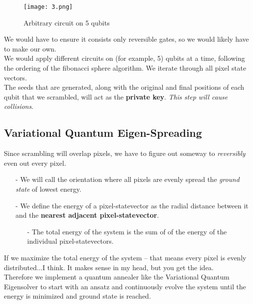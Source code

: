 \documentclass[svgnames]{article}     %
\begin{document}
\begin{figure}[H]
  \centering
    \texttt{[image: 3.png]}
    \caption{Arbitrary circuit on 5 qubits} 
\end{figure}

We would have to ensure it consists only reversible gates, so we would likely
have to make our own. \\

We would apply different circuits on (for example, 5) qubits at a time,
following the ordering of the fibonacci sphere algorithm. We iterate through
all pixel state vectors. \\

The seeds that are generated, along with the original and final positions of each qubit that we
scrambled, will act as the \textbf{private key}. \textit{This step will cause
collisions}. \\

\subsection{Variational Quantum Eigen-Spreading} 

Since scrambling will overlap pixels, we have to figure out someway to
\textit{reversibly} even out every pixel. \\

\begin{itemize}
\item[-]We will call the orientation where all pixels are evenly spread the
\textit{ground state} of lowest energy.
\item[-]We define the energy of a pixel-statevector as the radial distance
  between it and the \textbf{nearest adjacent pixel-statevector}. 
  \begin{itemize}
    \item[-] The total energy of the system is the sum of of the energy of
      the individual pixel-statevectors. 
  \end{itemize}
\end{itemize}

If we maximize the total energy of the system -- that means every pixel is
evenly distributed...I think. It makes sense in my head, but you get the
idea.\\

Therefore we implement a quantum annealer like the Variational Quantum
Eigensolver to start with an ansatz and continuously evolve the system until
the energy is minimized and ground state is reached. \\
\end{document}
